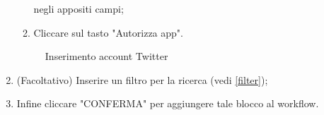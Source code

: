 \begin{enumerate}
\begin{enumerate}
			negli appositi campi;
			\item Cliccare sul tasto "Autorizza app".
		\end{enumerate}
	\begin{figure}[!ht]
		\centering
		\caption{Inserimento account Twitter}
	\end{figure}
	\newpage
	\item (Facoltativo) Inserire un filtro per la ricerca (vedi \ref{filter});
	\item Infine cliccare "CONFERMA" per aggiungere tale blocco al workflow.
	\begin{figure}[!ht]
		\centering

\end{figure}
\end{enumerate}
